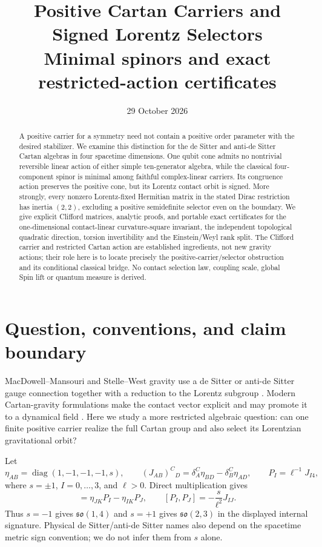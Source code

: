 \documentclass[11pt]{article}
\title{Positive Cartan Carriers and Signed Lorentz Selectors\\[0.4em]\large Minimal spinors and exact restricted-action certificates}
\author{}
\date{29 October 2026}
\theoremstyle{remark}\newtheorem{remark}[theorem]{Remark}
\newcommand{\so}{\mathfrak{so}}
\begin{document}
\maketitle

\begin{abstract}
A positive carrier for a symmetry need not contain a positive order parameter
with the desired stabilizer.
We examine this distinction for the de Sitter and anti-de Sitter Cartan
algebras in four spacetime dimensions.
One qubit cone admits no nontrivial reversible linear action of either
simple ten-generator algebra, while the classical four-component spinor is
minimal among faithful complex-linear carriers.
Its congruence action preserves the positive cone, but its Lorentz contact
orbit is signed.
More strongly, every nonzero Lorentz-fixed Hermitian matrix in the stated
Dirac restriction has inertia $(2,2)$, excluding a positive semidefinite
selector even on the boundary.
We give explicit Clifford matrices, analytic proofs, and portable exact
certificates for the one-dimensional contact-linear curvature-square
invariant, the independent topological quadratic direction, torsion
invertibility and the Einstein/Weyl rank split.
The Clifford carrier and restricted Cartan action are established ingredients,
not new gravity actions; their role here is to locate precisely the
positive-carrier/selector obstruction and its conditional classical bridge.
No contact selection law, coupling scale, global Spin lift or quantum measure
is derived.
\end{abstract}

\section{Question, conventions, and claim boundary}

MacDowell--Mansouri and Stelle--West gravity use a de Sitter or anti-de Sitter gauge
connection together with a reduction to the Lorentz subgroup
\cite{MacDowellMansouri,StelleWest,Wise}.  Modern Cartan-gravity formulations make the
contact vector explicit and may promote it to a dynamical field
\cite{WestmanZlosnikMatter,WestmanZlosnikExplore,WestmanZlosnikIntro}.  Here we study a
more restricted algebraic question: can one finite positive carrier realize the full
Cartan group and also select its Lorentzian gravitational orbit?

Let
\begin{equation}
 \eta_{AB}=\operatorname{diag}(1,-1,-1,-1,s),\qquad
 (J_{AB})^C{}_D=\delta_A^C\eta_{BD}-\delta_B^C\eta_{AD},
 \qquad P_I=\ell^{-1}J_{I4},
 \label{eq:cartan-generators}
\end{equation}
where $s=\pm1$, $I=0,\ldots,3$, and $\ell>0$.  Direct multiplication gives
\begin{equation}
 [J_{IJ},P_K]=\eta_{JK}P_I-\eta_{IK}P_J,\qquad
 [P_I,P_J]=-\frac{s}{\ell^2}J_{IJ}.
 \label{eq:cartan-brackets}
\end{equation}
Thus $s=-1$ gives $\so(1,4)$ and $s=+1$ gives $\so(2,3)$ in the displayed internal
signature.  Physical de Sitter/anti-de Sitter names also depend on the spacetime metric
sign convention; we do not infer them from $s$ alone.
\end{document}
